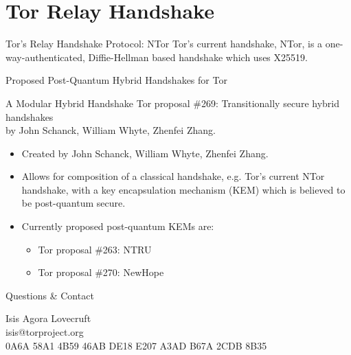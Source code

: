 \documentclass[9pt,a4paper]{beamer}
\begin{document}
\section{Tor Relay Handshake}

\begin{frame}{Tor's Relay Handshake Protocol: NTor}
  Tor's current handshake, NTor, is a one-way-authenticated, Diffie-Hellman based handshake which
  uses X25519.

\end{frame}


\begin{frame}{Proposed Post-Quantum Hybrid Handshakes for Tor}
  \begin{block}{A Modular Hybrid Handshake}
    Tor proposal \#269: Transitionally secure hybrid handshakes \\
    by John Schanck, William Whyte, Zhenfei Zhang.

    \begin{itemize}
      \item<2-> Created by John Schanck, William Whyte, Zhenfei Zhang.
      \item<3-> Allows for composition of a classical handshake, e.g. Tor's current NTor handshake,
        with a key encapsulation mechanism (KEM) which is believed to be post-quantum secure.
      \item<4-> Currently proposed post-quantum KEMs are:
        \begin{itemize}
          \item<5-> Tor proposal \#263: NTRU
          \item<6-> Tor proposal \#270: NewHope
        \end{itemize}
    \end{itemize}
  \end{block}

\end{frame}

\begin{frame}{Questions \& Contact}
  \begin{center}
  Isis Agora Lovecruft\\
  isis@torproject.org \\
  0A6A 58A1 4B59 46AB DE18  E207 A3AD B67A 2CDB 8B35
  \end{center}
\end{frame}
\end{document}
